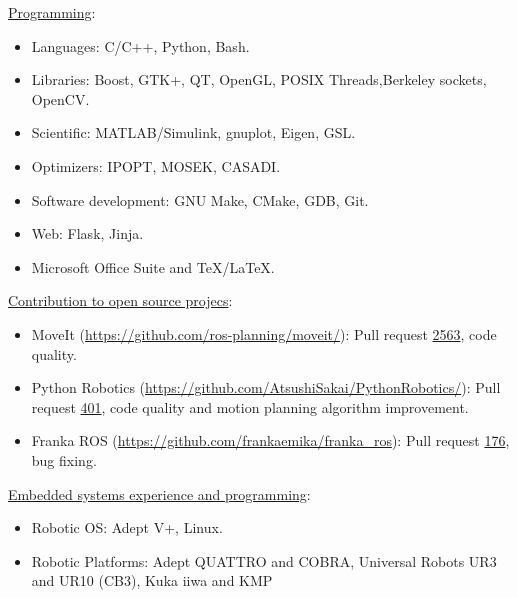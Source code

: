 \addskill%
{%
    \underline{Programming}:%
    \begin{itemize}[nosep, rightmargin=0cm]%
        \item Languages: C/C++, Python, Bash.%
        \item Libraries: Boost, GTK+, QT, OpenGL, POSIX Threads,Berkeley sockets, \\OpenCV.%
        \item Scientific: MATLAB/Simulink, gnuplot, Eigen, GSL.%
        \item Optimizers: IPOPT, MOSEK, CASADI.%
        \item Software development: GNU Make, CMake, GDB, Git.%
        \item Web: Flask, Jinja.%
        \item Microsoft Office Suite and TeX/LaTeX.%
    \end{itemize}%
}%
\addskill%
{%
    \underline{Contribution to open source projecs}:%
    \begin{itemize}[nosep, rightmargin=0cm]%
        \item MoveIt (\url{https://github.com/ros-planning/moveit/}): Pull request \href{https://github.com/ros-planning/moveit/pull/2563}{2563}, code quality.
        \item Python Robotics (\url{https://github.com/AtsushiSakai/PythonRobotics/}): Pull request  \href{https://github.com/AtsushiSakai/PythonRobotics/pull/401}{401}, code quality and motion planning algorithm improvement.
        \item Franka ROS (\url{https://github.com/frankaemika/franka_ros}): Pull request \href{https://github.com/frankaemika/franka_ros/pull/176}{176}, bug fixing.
    \end{itemize}%
}%
\addskill%
{%
    \underline{Embedded systems experience and programming}:%
    \begin{itemize}[nosep, rightmargin=0cm]%
        \item Robotic OS: Adept V+, Linux.%
        \item Robotic Platforms: Adept QUATTRO and COBRA, Universal Robots UR3 and UR10 (CB3), Kuka iiwa and KMP%
    \end{itemize}%
}%

